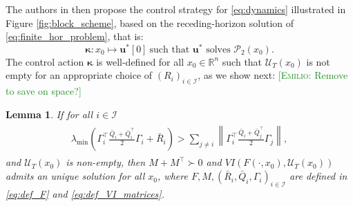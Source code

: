 \documentclass[letterpaper, 10 pt, conference]{ieeeconf}  %
\newcommand{\emiliosay}[1]{\textcolor{ForestGreen}{[\textsc{Emilio:} #1]}}
\newcommand{\R}{\mathbb{R}}
\newcommand{\mc}{\mathcal}
\newcommand{\bs}{\boldsymbol}
\newcommand{\bu}{\boldsymbol{u}}
\newtheorem{lemma}[theorem]{Lemma}
\begin{document}
The authors in \cite{benenati2024linear} then propose the control strategy for \eqref{eq:dynamics} illustrated in Figure \ref{fig:block_scheme}, based on the receding-horizon solution of \eqref{eq:finite_hor_problem}, that is:
\begin{equation}
    \bs\kappa:x_0\mapsto \bu^*[0] ~\text{such that $\bu^*$ solves $\mc P_2(x_0)$.}
\end{equation}
The control action $\bs\kappa$ is well-defined for all $x_0\in\R^n$ such that $\mc U_T(x_0)$ is not empty for an appropriate choice of $(R_i)_{i\in\mc I}$, as we show next:
\emiliosay{Remove to save on space?}
\begin{lemma}
    If for all $i\in\mc I$
    \begin{align} \label{eq:gerschgorin_criterion}
    \begin{split}
    \lambda_{\text{min}}\left(\Gamma_i^{\top}\frac{\bar{Q}_i + \bar{Q}_i^{\top}}{2}\Gamma_i + \bar{R}_i\right) > \sum_{j\neq i} \left\| \Gamma_i^\top\frac{\bar{Q}_i+\bar{Q}_j^{\top}}{2}\Gamma_j \right\|,
    \end{split}
\end{align}
    and $\mc U_T(x_0)$ is non-empty, then $M+M^{\top}\succ 0$ and $VI(F(\cdot, x_0), \mc U_T(x_0))$ admits an unique solution for all $x_0$, where $F,M, (\bar{R}_i,\bar{Q}_i, \Gamma_i)_{i\in\mc I}$ are defined in \eqref{eq:def_F} and \eqref{eq:def_VI_matrices}.
\end{lemma}
\end{document}
